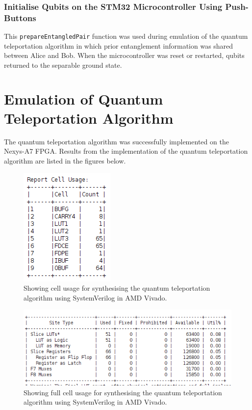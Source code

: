 \subsubsection{Initialise Qubits on the STM32 Microcontroller Using Push-Buttons}

This \texttt{prepareEntangledPair} function was used during emulation of the quantum teleportation algorithm in which prior entanglement information was shared between Alice and Bob. When the microcontroller was reset or restarted, qubits returned to the separable ground state. 

\section{\label{sec:ch5_subsec1}Emulation of Quantum Teleportation Algorithm}

The quantum teleportation algorithm was successfully implemented on the Nexys-A7 FPGA. Results from the implementation of the quantum teleportation algorithm are listed in the figures below.

\begin{figure}[!ht]
	\centering
	\includegraphics[width=0.45\linewidth]{body/ch6/figs/qta-resources}
	\caption[Showing Results from Synthesis of the Quantum Teleportation Algorithm]{Showing cell usage for synthesising the quantum teleportation algorithm using SystemVerilog in AMD Vivado.}
	\label{fig:qta-1}
\end{figure}

\begin{figure}[!ht]
	\centering
	\includegraphics[width=0.45\linewidth]{body/ch6/figs/qta-resources-full}
	\caption[Showing Results from Synthesis of the Quantum Teleportation Algorithm]{Showing full cell usage for synthesising the quantum teleportation algorithm using SystemVerilog in AMD Vivado.}
\label{fig:qta-2}
\end{figure}

